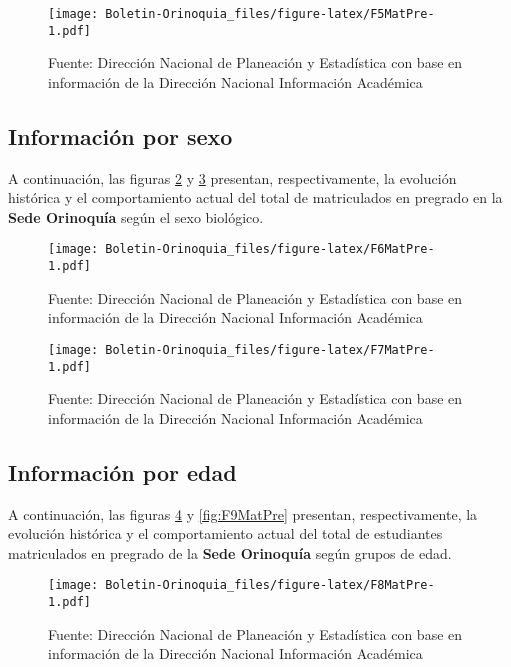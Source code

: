 \documentclass[
]{book}
\begin{document}
\begin{figure}
\centering
\texttt{[image: Boletin-Orinoquia\_files/figure-latex/F5MatPre-1.pdf]}
\caption{\label{fig:F5MatPre}Fuente: Dirección Nacional de Planeación y Estadística con base en información de la Dirección Nacional Información Académica}
\end{figure}

\hypertarget{informaciuxf3n-por-sexo-2}{%
\subsection{Información por sexo}\label{informaciuxf3n-por-sexo-2}}

A continuación, las figuras \ref{fig:F6MatPre} y \ref{fig:F7MatPre} presentan, respectivamente, la evolución histórica y el comportamiento actual del total de matriculados en pregrado en la \textbf{Sede Orinoquía} según el sexo biológico.

\begin{figure}
\centering
\texttt{[image: Boletin-Orinoquia\_files/figure-latex/F6MatPre-1.pdf]}
\caption{\label{fig:F6MatPre}Fuente: Dirección Nacional de Planeación y Estadística con base en información de la Dirección Nacional Información Académica}
\end{figure}

\begin{figure}
\centering
\texttt{[image: Boletin-Orinoquia\_files/figure-latex/F7MatPre-1.pdf]}
\caption{\label{fig:F7MatPre}Fuente: Dirección Nacional de Planeación y Estadística con base en información de la Dirección Nacional Información Académica}
\end{figure}

\hypertarget{informaciuxf3n-por-edad-2}{%
\subsection{Información por edad}\label{informaciuxf3n-por-edad-2}}

A continuación, las figuras \ref{fig:F8MatPre} y \ref{fig:F9MatPre} presentan, respectivamente, la evolución histórica y el comportamiento actual del total de estudiantes matriculados en pregrado de la \textbf{Sede Orinoquía} según grupos de edad.

\begin{figure}
\centering
\texttt{[image: Boletin-Orinoquia\_files/figure-latex/F8MatPre-1.pdf]}
\caption{\label{fig:F8MatPre}Fuente: Dirección Nacional de Planeación y Estadística con base en información de la Dirección Nacional Información Académica}
\end{figure}
\end{document}
